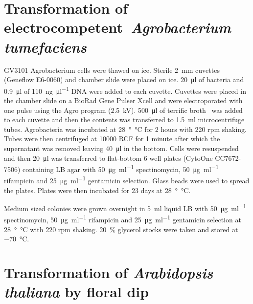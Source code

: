 \documentclass[../main.tex]{subfiles}
\begin{document}
\section{Transformation of electrocompetent~\textit{Agrobacterium tumefaciens}}

GV3101 Agrobacterium cells were thawed on ice.
Sterile \SI{2}{\mm} cuvettes (Geneflow E6\hyp{}0060) and chamber slide were placed on ice.
\SI{20}{\micro\litre} of bacteria and \SI{0.9}{\micro\litre} of \SI{110}{\nano\gram\per\micro\litre} DNA were added to each cuvette.
Cuvettes were placed in the chamber slide on a BioRad Gene Pulser Xcell and were electroporated with one pulse using the Agro program (\SI{2.5}{\kilo\volt}).
\SI{500}{\micro\litre} of terrific broth~\autocite{tartoffImprovedMediaGrowing} was added to each cuvette and then the contents was transferred to \SI{1.5}{\ml} microcentrifuge tubes.
Agrobacteria was incubated at \SI{28}{\degree\celsius} for 2 hours with 220 rpm shaking.
Tubes were then centrifuged at 10000 RCF for 1 minute after which the supernatant was removed leaving \SI{40}{\micro\litre} in the bottom.
Cells were resuspended and then \SI{20}{\micro\litre} was transferred to flat-bottom 6 well plates (CytoOne CC7672\hyp{}7506) containing LB agar with \SI{50}{\micro\gram\per\ml} spectinomycin, \SI{50}{\micro\gram\per\ml} rifampicin and \SI{25}{\micro\gram\per\ml} gentamicin selection.
Glass beads were used to spread the plates.
Plates were then incubated for 2\textendash{}3 days at \SI{28}{\degree\celsius}.

Medium sized colonies were grown overnight in \SI{5}{\ml} liquid LB with \SI{50}{\micro\gram\per\ml} spectinomycin, \SI{50}{\micro\gram\per\ml} rifampicin and \SI{25}{\micro\gram\per\ml} gentamicin selection at \SI{28}{\degree\celsius} with 220 rpm shaking.
\SI{20}{\percent} glycerol stocks were taken and stored at \SI{-70}{\degreeCelsius}.

\section{Transformation of \textit{Arabidopsis thaliana} by floral dip}\label{chapter2:methods:floral-dip}
\end{document}
